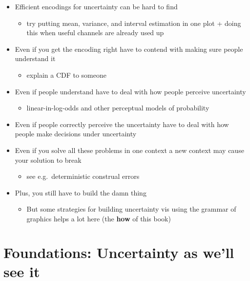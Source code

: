 \documentclass[]{book}
\providecommand{\tightlist}{%
  \setlength{\itemsep}{0pt}\setlength{\parskip}{0pt}}
\theoremstyle{definition}
\theoremstyle{definition}
\theoremstyle{definition}
\theoremstyle{remark}
\begin{document}
\begin{itemize}
\tightlist
\item
  Efficient encodings for uncertainty can be hard to find

  \begin{itemize}
  \tightlist
  \item
    try putting mean, variance, and interval estimation in one plot +
    doing this when useful channels are already used up
  \end{itemize}
\item
  Even if you get the encoding right have to contend with making sure
  people understand it

  \begin{itemize}
  \tightlist
  \item
    explain a CDF to someone
  \end{itemize}
\item
  Even if people understand have to deal with how people perceive
  uncertainty

  \begin{itemize}
  \tightlist
  \item
    linear-in-log-odds and other perceptual models of probability
  \end{itemize}
\item
  Even if people correctly perceive the uncertainty have to deal with
  how people make decisions under uncertainty
\item
  Even if you solve all these problems in one context a new context may
  cause your solution to break

  \begin{itemize}
  \tightlist
  \item
    see e.g.~deterministic construal errors
  \end{itemize}
\item
  Plus, you still have to build the damn thing

  \begin{itemize}
  \tightlist
  \item
    But some strategies for building uncertainty vis using the grammar
    of graphics helps a lot here (the \textbf{how} of this book)
  \end{itemize}
\end{itemize}

\hypertarget{ch-uncertainty}{%
\chapter{Foundations: Uncertainty as we'll see
it}\label{ch-uncertainty}}
\end{document}
